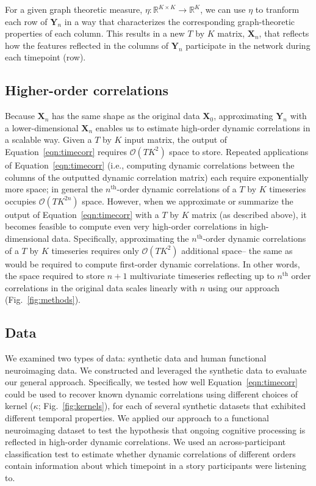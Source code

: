 \documentclass[english]{article}
\begin{document}
For a given graph theoretic measure,
$\eta: \mathbb{R}^{K \times K} \rightarrow \mathbb{R}^K$, we can use
$\eta$ to tranform each row of $\mathbf{Y}_n$ in a way that
characterizes the corresponding graph-theoretic properties of each
column.  This results in a new $T$ by $K$ matrix, $\mathbf{X}_n$, that
reflects how the features reflected in the columns of $\mathbf{Y}_n$
participate in the network during each timepoint (row).


\subsection*{Higher-order correlations}

Because $\mathbf{X}_n$ has the same shape as the original data
$\mathbf{X}_0$, approximating $\mathbf{Y}_n$ with a lower-dimensional
$\mathbf{X}_n$ enables us to estimate high-order dynamic correlations
in a scalable way.  Given a $T$ by $K$ input matrix, the output of
Equation~\ref{eqn:timecorr} requires $\mathcal{O}(TK^2)$ space to
store.  Repeated applications of Equation~\ref{eqn:timecorr} (i.e.,
computing dynamic correlations between the columns of the outputted
dynamic correlation matrix) each require exponentially more space; in
general the $n^\mathrm{th}$-order dynamic correlations of a $T$ by $K$
timeseries occupies $\mathcal{O}(TK^{2n})$ space.  However, when we
approximate or summarize the output of Equation~\ref{eqn:timecorr} with a $T$ by
$K$ matrix (as described above), it becomes feasible to compute even
very high-order correlations in high-dimensional data.  Specifically,
approximating the $n^\mathrm{th}$-order dynamic correlations of a $T$
by $K$ timeseries requires only $\mathcal{O}(TK^2)$ additional space--
the same as would be required to compute first-order dynamic
correlations. In other words, the space required to store $n+1$
multivariate timeseries reflecting up to $n^\mathrm{th}$ order
correlations in the original data scales linearly with $n$ using our
approach (Fig.~\ref{fig:methods}).

\subsection*{Data}
We examined two types of data: synthetic data and human functional
neuroimaging data.  We constructed and leveraged the synthetic data to
evaluate our general approach.  Specifically, we tested how well
Equation~\ref{eqn:timecorr} could be used to recover known dynamic
correlations using different choices of kernel ($\kappa$;
Fig.~\ref{fig:kernels}), for each of several synthetic datasets that
exhibited different temporal properties.  We applied our approach to a
functional neuroimaging dataset to test the hypothesis that ongoing
cognitive processing is reflected in high-order dynamic correlations.
We used an across-participant classification test to estimate whether
dynamic correlations of different orders contain information about
which timepoint in a story participants were listening to.
\end{document}
